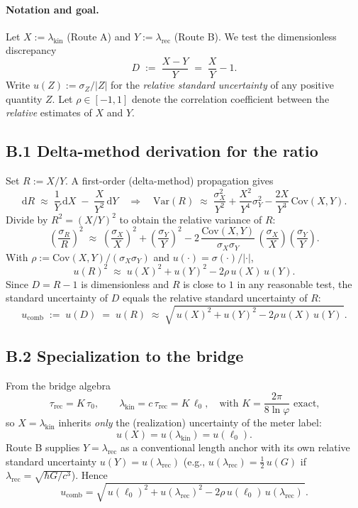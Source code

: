 \documentclass[11pt]{article}
\theoremstyle{plain}
\theoremstyle{definition}
\theoremstyle{remark}
\begin{document}
\paragraph{Notation and goal.}
Let \(X:=\lambda_{\mathrm{kin}}\) (Route A) and \(Y:=\lambda_{\mathrm{rec}}\) (Route B). We test the dimensionless discrepancy
\[
D\;:=\;\frac{X-Y}{Y}\;=\;\frac{X}{Y}-1.
\]
Write \(u(Z):=\sigma_Z/|Z|\) for the \emph{relative standard uncertainty} of any positive quantity \(Z\). Let \(\rho\in[-1,1]\) denote the correlation coefficient between the \emph{relative} estimates of \(X\) and \(Y\).

\subsection*{B.1 Delta-method derivation for the ratio}
Set \(R:=X/Y\). A first-order (delta-method) propagation gives
\[
\mathrm{d}R \;\approx\; \frac{1}{Y}\,\mathrm{d}X \;-\; \frac{X}{Y^2}\,\mathrm{d}Y
\quad\Rightarrow\quad
\mathrm{Var}(R) \;\approx\; \frac{\sigma_X^2}{Y^2}+\frac{X^2}{Y^4}\sigma_Y^2-\frac{2X}{Y^3}\,\mathrm{Cov}(X,Y).
\]
Divide by \(R^2=(X/Y)^2\) to obtain the relative variance of \(R\):
\[
\left(\frac{\sigma_R}{R}\right)^2
\;\approx\;
\left(\frac{\sigma_X}{X}\right)^2
+
\left(\frac{\sigma_Y}{Y}\right)^2
-
2\,\frac{\mathrm{Cov}(X,Y)}{\sigma_X\sigma_Y}\,
\left(\frac{\sigma_X}{X}\right)\!\left(\frac{\sigma_Y}{Y}\right).
\]
With \(\rho:=\mathrm{Cov}(X,Y)/(\sigma_X\sigma_Y)\) and \(u(\cdot)=\sigma(\cdot)/|\cdot|\),
\[
u(R)^2 \;\approx\; u(X)^2 + u(Y)^2 - 2\rho\,u(X)\,u(Y).
\]
Since \(D=R-1\) is dimensionless and \(R\) is close to \(1\) in any reasonable test, the standard uncertainty of \(D\) equals the relative standard uncertainty of \(R\):
\[
u_{\mathrm{comb}} \;:=\; u(D) \;=\; u(R)
\;\approx\;
\sqrt{\,u(X)^2 + u(Y)^2 - 2\rho\,u(X)\,u(Y)\,}.
\]

\subsection*{B.2 Specialization to the bridge}
From the bridge algebra
\[
\tau_{\mathrm{rec}}=K\,\tau_0,\qquad \lambda_{\mathrm{kin}}=c\,\tau_{\mathrm{rec}}=K\,\ell_0,
\quad\text{with }K=\frac{2\pi}{8\ln\varphi}\text{ exact,}
\]
so \(X=\lambda_{\mathrm{kin}}\) inherits \emph{only} the (realization) uncertainty of the meter label:
\[
u(X)=u(\lambda_{\mathrm{kin}})=u(\ell_0).
\]
Route B supplies \(Y=\lambda_{\mathrm{rec}}\) as a conventional length anchor with its own relative standard uncertainty \(u(Y)=u(\lambda_{\mathrm{rec}})\) (e.g., \(u(\lambda_{\mathrm{rec}})=\tfrac12\,u(G)\) if \(\lambda_{\mathrm{rec}}=\sqrt{\hbar G / c^3}\)).
Hence
\[
u_{\mathrm{comb}}
=
\sqrt{\,u(\ell_0)^2 + u(\lambda_{\mathrm{rec}})^2 - 2\rho\,u(\ell_0)\,u(\lambda_{\mathrm{rec}})\,}.
\]
\end{document}
